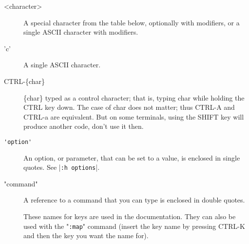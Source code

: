 \begin{description}
				\item[<character>]
								\label{<character>}
								A special character from the table below, optionally with modifiers, or a single ASCII character with modifiers.

				\item['c']
								\label{'character'}
								A single ASCII character.

				\item[CTRL-\{char\}]
								\label{CTRL-{char}}
								\{char\} typed as a control character; that is, typing {char} while holding the CTRL key down.
								The case of {char} does not matter; thus CTRL-A and CTRL-a are equivalent.
								But on some terminals, using the SHIFT key will produce another code, don't use it then.

				\item[\verb!'option'!]
								\label{'option'}
								An option, or parameter, that can be set to a value, is enclosed in single quotes.
								See |\verb!:h options!|.

				\item["command"]
								\label{quotecommandquote}
								A reference to a command that you can type is enclosed in double quotes.

				\item[]
								\label{key-notation}
								\label{key-codes}
								\label{keycodes}
These names for keys are used in the documentation.
They can also be used with the "\verb!:map!" command (insert the key name by pressing CTRL-K and then the key you want the name for).


\end{description}

